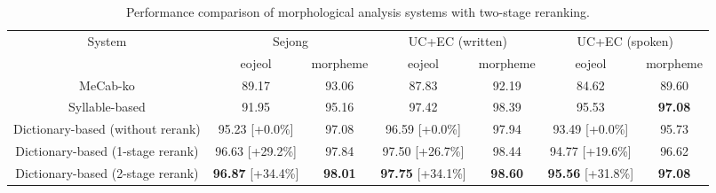 \documentclass[AMS,STIX2COL]{WileyNJD-v2}
\begin{document}
    \begin{table}[ht]
        \caption{Performance comparison of morphological analysis systems with two-stage reranking.}
        \label{tab:performance-with-reranking}
        \begin{tabular*}{500pt}{@{\extracolsep\fill}c|cccccc@{\extracolsep\fill}}
            \toprule
            \multirow{2}{*}{System}                       & \multicolumn{2}{c}{Sejong}                                             & \multicolumn{2}{c}{UC+EC (written)}                                    & \multicolumn{2}{c}{UC+EC (spoken)}                                     \\
            \cmidrule{2-3} \cmidrule{4-5} \cmidrule{6-7}
            ~                                             & \multicolumn{1}{c}{eojeol}              & \multicolumn{1}{c}{morpheme} & \multicolumn{1}{c}{eojeol}              & \multicolumn{1}{c}{morpheme} & \multicolumn{1}{c}{eojeol}              & \multicolumn{1}{c}{morpheme} \\
            \midrule
            \hspace{2mm}MeCab-ko                          & 89.17                                   & 93.06                        & 87.83                                   & 92.19                        & 84.62                                   & 89.60                        \\
            \hspace{2mm}Syllable-based                    & 91.95                                   & 95.16                        & 97.42                                   & 98.39                        & 95.53                                   & \textbf{97.08}               \\
            \hspace{2mm}Dictionary-based (without rerank) & 95.23\footnotesize{ [+0.0\%]}           & 97.08                        & 96.59\footnotesize{ [+0.0\%]}           & 97.94                        & 93.49\footnotesize{ [+0.0\%]}           & 95.73                        \\
            \hspace{2mm}Dictionary-based (1-stage rerank) & 96.63\footnotesize{ [+29.2\%]}          & 97.84                        & 97.50\footnotesize{ [+26.7\%]}          & 98.44                        & 94.77\footnotesize{ [+19.6\%]}          & 96.62                        \\
            \hspace{2mm}Dictionary-based (2-stage rerank) & \textbf{96.87}\footnotesize{ [+34.4\%]} & \textbf{98.01}               & \textbf{97.75}\footnotesize{ [+34.1\%]} & \textbf{98.60}               & \textbf{95.56}\footnotesize{ [+31.8\%]} & \textbf{97.08}               \\

\end{tabular*}
\end{table}
\end{document}
